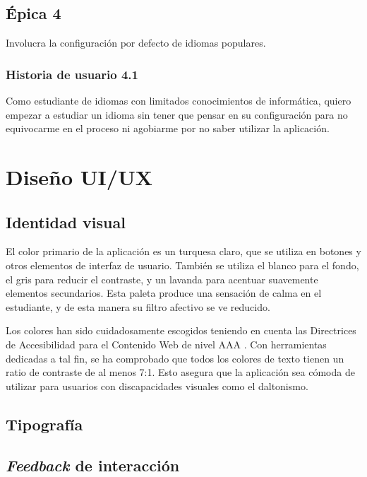 \subsection{Épica 4}

Involucra la configuración por defecto de idiomas populares.

\subsubsection{Historia de usuario 4.1}

Como estudiante de idiomas con limitados conocimientos de informática, quiero empezar a estudiar un idioma sin tener que pensar en su configuración para no equivocarme en el proceso ni agobiarme por no saber utilizar la aplicación.

\section{Diseño UI/UX}

\subsection{Identidad visual}


El color primario de la aplicación es un turquesa claro, que se utiliza en botones y otros elementos de interfaz de usuario. También se utiliza el blanco para el fondo, el gris para reducir el contraste, y un lavanda para acentuar suavemente elementos secundarios. Esta paleta produce una sensación de calma en el estudiante, y de esta manera su filtro afectivo se ve reducido.

Los colores han sido cuidadosamente escogidos teniendo en cuenta las Directrices de Accesibilidad para el Contenido Web de nivel AAA \autocite{wcag}. Con herramientas dedicadas a tal fin, se ha comprobado que todos los colores de texto tienen un ratio de contraste de al menos 7:1. Esto asegura que la aplicación sea cómoda de utilizar para usuarios con discapacidades visuales como el daltonismo.

\subsection{Tipografía}

\todo

\subsection{\textit{Feedback} de interacción}

